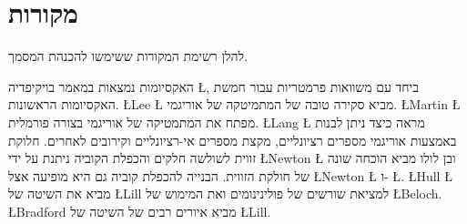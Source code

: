 
\chapter*{מקורות}\label{c.ref}

להלן רשימת המקורות ששימשו להכנהת המסמך.

האקסיומות נמצאות במאמר בויקיפדיה%
\L{\cite{hh}},
ביחד עם משוואות פרמטריות עבור חמשת האקסיומות הראשונות.
\L{Lee}
\L{\cite[4~]{hwa}}
מביא סקירה טובה של המתמיטקה של אוריגמי. 
\L{Martin} \L{\cite[10~]{martin}}
מפתח את המתמטיקה של אוריגמי בצורה פורמלית.
\L{Lang} \L{\cite{lang}}
מראה כיצד ניתן לבנות באמצעות אוריגמי מספרים רציונליים, מקצת מספרים אי-רציונליים וקירובים לאחרים.
חלוקת זווית לשולשה חלקים והכפלת הקוביה ניתנת על ידי
\L{Newton}
\L{\cite{newton}}
ובן לולו מביא הוכחה שונה של חולקת הזווית. הבנייה להכפלת קוביה גם היא מופיעה אצל 
\L{Newton}
\L{\cite{newton}}
ו-%
\L{\cite{hwa}}. 
\L{Hull} \L{\cite{hull-beloch}}
מביא את השיטה של
\L{Lill}
למציאת שורשים של פולינינומים ואת המימוש של 
\L{Beloch}. 
\L{Bradford} \cite{bradford} 
מביא איורים רבים של השיטה של 
\L{Lill}.

\begingroup
\renewcommand\bibname{}
\let\clearpage\relax
\vspace{-4ex}


\endgroup